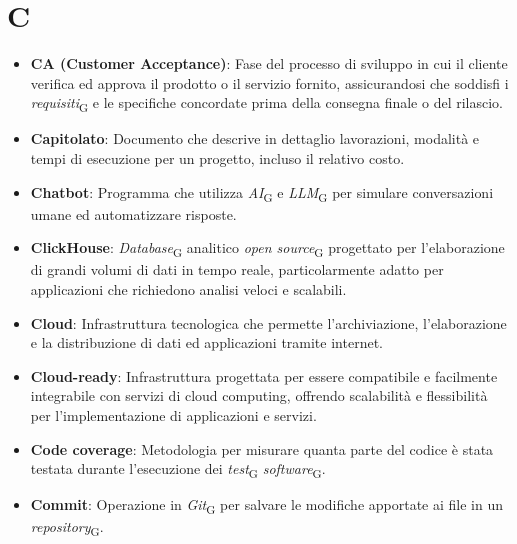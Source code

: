 \section{C}
\begin{itemize}
    \item \textbf{CA (Customer Acceptance)}: Fase del processo di sviluppo in cui il cliente verifica ed approva il prodotto o il servizio fornito, assicurandosi che soddisfi i \textit{requisiti}\textsubscript{G} e le specifiche concordate prima della consegna finale o del rilascio.
    \item \textbf{Capitolato}: Documento che descrive in dettaglio lavorazioni, modalità e tempi di esecuzione per un progetto, incluso il relativo costo.
    \item \textbf{Chatbot}: Programma che utilizza \textit{AI}\textsubscript{G} e \textit{LLM}\textsubscript{G} per simulare conversazioni umane ed automatizzare risposte.
    \item \textbf{ClickHouse}: \textit{Database}\textsubscript{G} analitico \textit{open source}\textsubscript{G} progettato per l'elaborazione di grandi volumi di dati in tempo reale, particolarmente adatto per applicazioni che richiedono analisi veloci e scalabili.
    \item \textbf{Cloud}: Infrastruttura tecnologica che permette l'archiviazione, l'elaborazione e la distribuzione di dati ed applicazioni tramite internet.
    \item \textbf{Cloud-ready}: Infrastruttura progettata per essere compatibile e facilmente integrabile con servizi di cloud computing, offrendo scalabilità e flessibilità per l'implementazione di applicazioni e servizi.
    \item \textbf{Code coverage}: Metodologia per misurare quanta parte del codice è stata testata durante l'esecuzione dei \textit{test}\textsubscript{G} \textit{software}\textsubscript{G}.
    \item \textbf{Commit}: Operazione in \textit{Git}\textsubscript{G} per salvare le modifiche apportate ai file in un \textit{repository}\textsubscript{G}.

\end{itemize}
